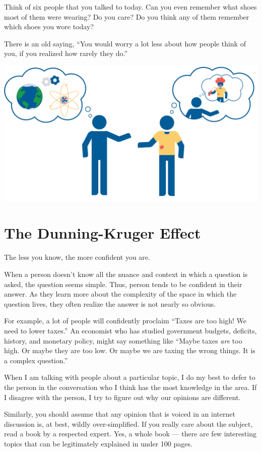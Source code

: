 Think of six people that you talked to today. Can you even remember what
shoes most of them were wearing? Do you care? Do you think any of them
remember which shoes you wore today?

There is an old saying, ``You would worry a lot less about how people
think of you, if you realized how rarely they do.''

\includegraphics[width=1\textwidth]{spotlightEffect.png}

\section{The Dunning-Kruger Effect}

The less you know, the more confident you are.

When a person doesn't know all the nuance and context in which a question is
asked, the question seems simple. Thus, person tends to be confident in
their answer. As they learn more about the complexity of the space in
which the question lives, they often realize the answer is not nearly so
obvious.

For example, a lot of people will confidently proclaim ``Taxes are too
high! We need to lower taxes.''  An economist who has studied
government budgets, deficits, history, and monetary policy, might say
something like ``Maybe taxes \emph{are} too high. Or maybe they are
too low. Or maybe we are taxing the wrong things. It is a 
complex question.''

When I am talking with people about a particular topic, I do my best
to defer to the person in the conversation who I think has the most
knowledge in the area. If I disagree with the person, I try to figure
out why our opinions are different.

Similarly, you should assume that any opinion that is voiced in an
internet discussion is, at best, wildly over-simplified. If you really care
about the subject, read a book by a respected expert. Yes, a whole
book --- there are few interesting topics that can be legitimately
explained in under 100 pages.

